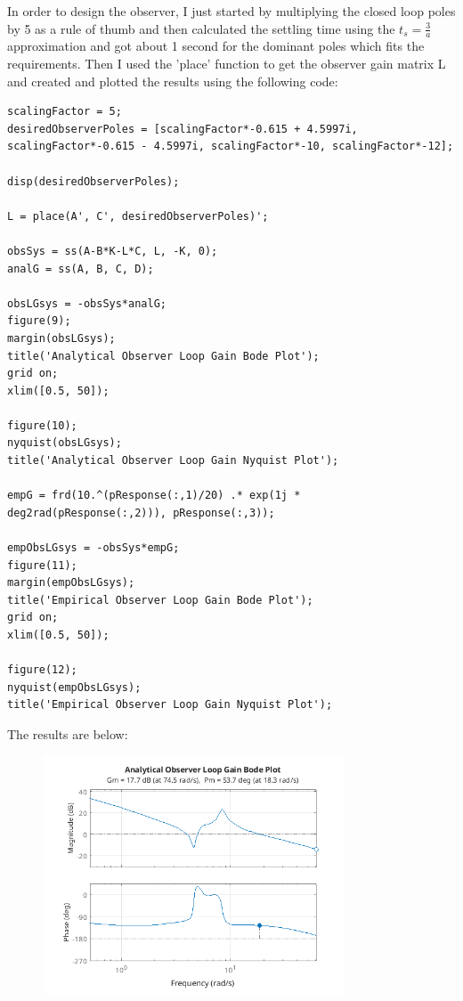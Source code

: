 \documentclass{article}
\begin{document}
In order to design the observer, I just started by multiplying the closed loop poles by 5 as a rule of thumb and then calculated the settling time using the $t_s = \frac{3}{a}$ approximation and got about 1 second for the dominant poles which fits the requirements.
Then I used the 'place' function to get the observer gain matrix L and created and plotted the results using the following code:

\begin{lstlisting}[style=matlabstyle]
scalingFactor = 5;
desiredObserverPoles = [scalingFactor*-0.615 + 4.5997i, scalingFactor*-0.615 - 4.5997i, scalingFactor*-10, scalingFactor*-12];

disp(desiredObserverPoles);

L = place(A', C', desiredObserverPoles)';

obsSys = ss(A-B*K-L*C, L, -K, 0);
analG = ss(A, B, C, D);

obsLGsys = -obsSys*analG;
figure(9);
margin(obsLGsys);
title('Analytical Observer Loop Gain Bode Plot');
grid on;
xlim([0.5, 50]);

figure(10);
nyquist(obsLGsys);
title('Analytical Observer Loop Gain Nyquist Plot');

empG = frd(10.^(pResponse(:,1)/20) .* exp(1j * deg2rad(pResponse(:,2))), pResponse(:,3));

empObsLGsys = -obsSys*empG;
figure(11);
margin(empObsLGsys);
title('Empirical Observer Loop Gain Bode Plot');
grid on;
xlim([0.5, 50]);

figure(12);
nyquist(empObsLGsys);
title('Empirical Observer Loop Gain Nyquist Plot');
\end{lstlisting}    

The results are below:
\begin{figure}[H]
\centering
\includegraphics[width=0.8\textwidth]{analObsResp.png}
\label{fig:analObsResp}
\end{figure}
\end{document}
